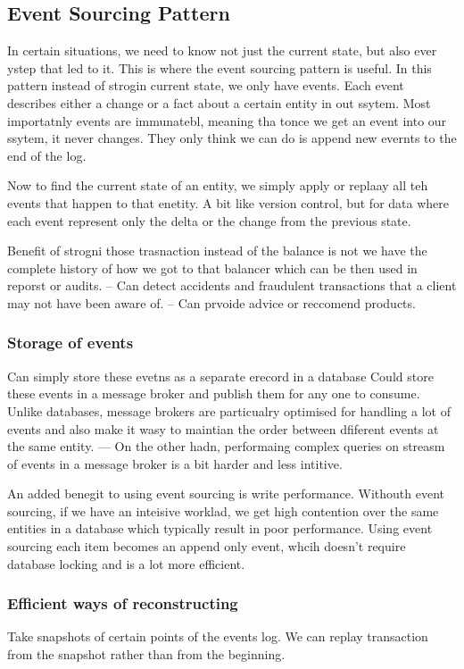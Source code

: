 \documentclass[a4paper, 11pt]{book}
\begin{document}
{    \subsection{Event Sourcing Pattern}
    In certain situations, we need to know not just the current state, but also ever ystep that led to it.
    This is where the event sourcing pattern is useful.
    In this pattern instead of strogin current state, we only have events.
    Each event describes either a change or a fact about a certain entity in out ssytem.
    Most importatnly events are immunatebl, meaning tha tonce we get an event into our ssytem, it never changes.
    They only think we can do is append new evernts to the end of the log.

    Now to find the current state of an entity, we simply apply or replaay all teh events that happen to that enetity.
    A bit like version control, but for data where each event represent only the delta or the change from the previous state.

    Benefit of strogni those trasnaction instead of the balance is not we have the complete history of how we got to that balancer which can be then used in reporst or audits.
    -- Can detect accidents and fraudulent transactions that a client may not have been aware of.
    -- Can prvoide advice or reccomend products.

    \subsubsection{Storage of events}
    Can simply store these evetns as a separate erecord in a database
    Could store these events in a message broker and publish them for any one to consume. Unlike databases,  message brokers are particualry optimised for handling a lot of events and also make it wasy to maintian the order between dfiferent events at the same entity.
    --- On the other hadn, performaing complex queries on streasm of events in a message broker is a bit harder and less intitive.

    An added benegit to using event sourcing is write performance.
    Withouth event sourcing, if we have an inteisive worklad, we get high contention over the same entities in a database which typically result in poor performance.
    Using event sourcing each item becomes an append only event, whcih doesn't require database locking and is a lot more efficient.

    \subsubsection{Efficient ways of reconstructing}
    Take snapshots of certain points of the events log.
    We can replay transaction from the snapshot rather than from the beginning.

}
\end{document}
